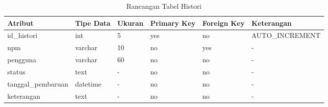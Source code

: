 \begin{table}[ht]
\caption[Tabel Rancangan Tabel Histori]{Rancangan Tabel Histori}
\label{tab:rancangantabelhistori}
\centering
\begin{tabular}{|l|l|p{1.2cm}|p{1.2cm}|p{1.2cm}|l|}
\hline
Atribut & Tipe Data & Ukuran & Primary Key & Foreign Key & Keterangan\\
\hline
id\_histori & int & 5 & yes & no & AUTO\_INCREMENT\\
\hline
npm & varchar & 10 & no & yes & -\\
\hline
pengguna & varchar & 60 & no & no & -\\
\hline
status & text & - & no & no & -\\
\hline
tanggal\_pembaruan & datetime & - & no & no & -\\
\hline
keterangan & text & - & no & no & -\\
\hline
\end{tabular}
\end{table}





